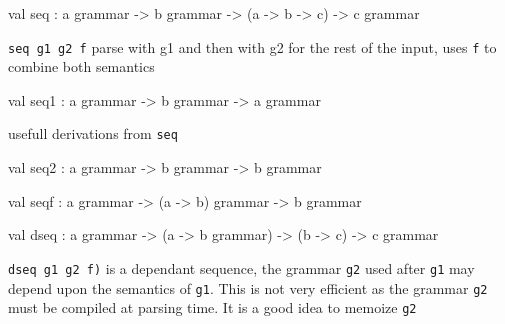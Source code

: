 \documentclass[11pt]{article}
\begin{document}
\label{val:Grammar.seq}\begin{ocamldoccode}
val seq : {\textquotesingle}a grammar ->
  {\textquotesingle}b grammar -> ({\textquotesingle}a -> {\textquotesingle}b -> {\textquotesingle}c) -> {\textquotesingle}c grammar
\end{ocamldoccode}
\begin{ocamldocdescription}
{\tt{seq g1 g2 f}} parse with g1 and then with g2 for the rest of the input, uses {\tt{f}}
    to combine both semantics


\end{ocamldocdescription}




\label{val:Grammar.seq1}\begin{ocamldoccode}
val seq1 : {\textquotesingle}a grammar -> {\textquotesingle}b grammar -> {\textquotesingle}a grammar
\end{ocamldoccode}
\begin{ocamldocdescription}
usefull derivations from {\tt{seq}}


\end{ocamldocdescription}




\label{val:Grammar.seq2}\begin{ocamldoccode}
val seq2 : {\textquotesingle}a grammar -> {\textquotesingle}b grammar -> {\textquotesingle}b grammar
\end{ocamldoccode}




\label{val:Grammar.seqf}\begin{ocamldoccode}
val seqf : {\textquotesingle}a grammar -> ({\textquotesingle}a -> {\textquotesingle}b) grammar -> {\textquotesingle}b grammar
\end{ocamldoccode}




\label{val:Grammar.dseq}\begin{ocamldoccode}
val dseq : {\textquotesingle}a grammar ->
  ({\textquotesingle}a -> {\textquotesingle}b grammar) -> ({\textquotesingle}b -> {\textquotesingle}c) -> {\textquotesingle}c grammar
\end{ocamldoccode}
\begin{ocamldocdescription}
{\tt{dseq g1 g2 f)}} is a dependant sequence, the grammar {\tt{g2}} used after {\tt{g1}} may
    depend upon the semantics of {\tt{g1}}. This is not very efficient as the grammar
    {\tt{g2}} must be compiled at parsing time. It is a good idea to memoize {\tt{g2}}


\end{ocamldocdescription}
\end{document}
